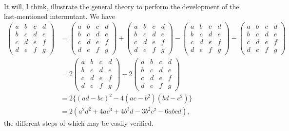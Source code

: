 \documentclass[11pt,a4paper]{book}
\begin{document}
It will, I think, illustrate the general theory to perform the development of the last-mentioned intermutant. We have
\begin{align*}
\begin{pmatrix} a & b & c & d \\ b & c & d & e \\ c & d & e & f \\ d & e & f & g \end{pmatrix} &= \begin{pmatrix} a & b & c & d \\ b & c & d & e \\ c & d & e & f \\ d & e & f & g \end{pmatrix} + \begin{pmatrix} a & b & c & d \\ b & c & d & e \\ c & d & e & f \\ d & e & f & g \end{pmatrix} - \begin{pmatrix} a & b & c & d \\ b & c & d & e \\ c & d & e & f \\ d & e & f & g \end{pmatrix} - \begin{pmatrix} a & b & c & d \\ b & c & d & e \\ c & d & e & f \\ d & e & f & g \end{pmatrix} \\
&= 2 \begin{pmatrix} a & b & c & d \\ b & c & d & e \\ c & d & e & f \\ d & e & f & g \end{pmatrix} - 2 \begin{pmatrix} a & b & c & d \\ b & c & d & e \\ c & d & e & f \\ d & e & f & g \end{pmatrix} \\
&= 2\{(ad - bc)^2 - 4(ac - b^2)(bd - c^2)\} \\
&= 2(a^2d^2 + 4ac^3 + 4b^3d - 3b^2c^2 - 6abcd),
\end{align*}
the different steps of which may be easily verified.
\end{document}
